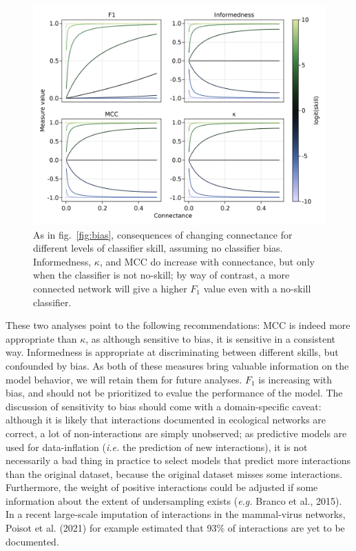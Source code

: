 \documentclass[10pt,oneside]{article}
\makeatletter
\def\maxwidth{\ifdim\Gin@nat@width>\linewidth\linewidth
\else\Gin@nat@width\fi}
\let\Oldincludegraphics\includegraphics
\renewcommand{\includegraphics}[1]{\Oldincludegraphics[width=\maxwidth]{#1}}
\makeatother
\begin{document}
\begin{figure}
\hypertarget{fig:connectance}{%
\centering
\includegraphics{figures/changing-connectance.png}
\caption{As in fig.~\ref{fig:bias}, consequences of changing connectance
for different levels of classifier skill, assuming no classifier bias.
Informedness, \(\kappa\), and MCC do increase with connectance, but only
when the classifier is not no-skill; by way of contrast, a more
connected network will give a higher \(F_1\) value even with a no-skill
classifier.}\label{fig:connectance}
}
\end{figure}

These two analyses point to the following recommendations: MCC is indeed
more appropriate than \(\kappa\), as although sensitive to bias, it is
sensitive in a consistent way. Informedness is appropriate at
discriminating between different skills, but confounded by bias. As both
of these measures bring valuable information on the model behavior, we
will retain them for future analyses. \(F_1\) is increasing with bias,
and should not be prioritized to evalue the performance of the model.
The discussion of sensitivity to bias should come with a domain-specific
caveat: although it is likely that interactions documented in ecological
networks are correct, a lot of non-interactions are simply unobserved;
as predictive models are used for data-inflation (\emph{i.e.} the
prediction of new interactions), it is not necessarily a bad thing in
practice to select models that predict more interactions than the
original dataset, because the original dataset misses some interactions.
Furthermore, the weight of positive interactions could be adjusted if
some information about the extent of undersampling exists (\emph{e.g.}
Branco et al., 2015). In a recent large-scale imputation of interactions
in the mammal-virus networks, Poisot et al. (2021) for example estimated
that 93\% of interactions are yet to be documented.
\end{document}
